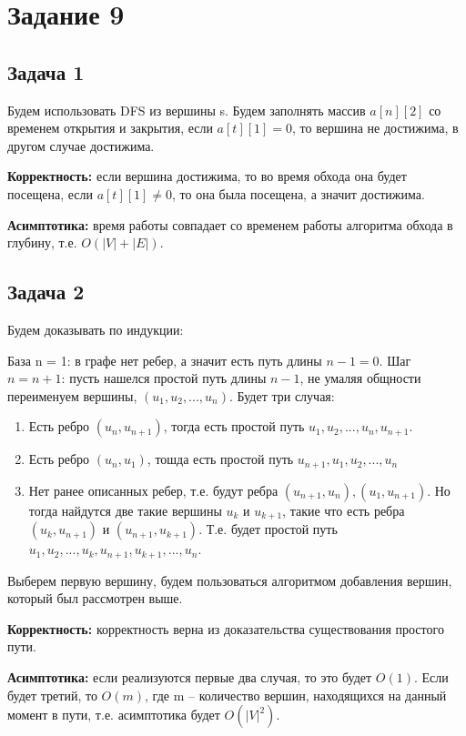 \documentclass[a4paper,14pt]{article} %
\begin{document}

\section{Задание 9}
\subsection{Задача 1}
Будем использовать DFS из вершины s. Будем заполнять массив $a[n][2]$ со временем открытия и закрытия,
 если $a[t][1] = 0$, то вершина не достижима, в другом случае достижима.

 \textbf{Корректность:} если вершина достижима, то во время обхода она будет посещена, если $a[t][1] \not = 0$, то она была посещена, а значит достижима.

 \textbf{Асимптотика:} время работы совпадает со временем работы алгоритма обхода в глубину, т.е. $O(|V| + |E|)$.

\subsection{Задача 2}
Будем доказывать по индукции:

База n = 1: в графе нет ребер, а значит есть путь длины $n - 1 = 0$.
\newline
Шаг $n = n + 1$: пусть нашелся простой путь длины $n - 1$, не умаляя общности переименуем вершины, $(u_1, u_2, ..., u_n)$.
Будет три случая:
\begin{enumerate}
	\item Есть ребро $(u_n, u_{n+1})$, тогда есть простой путь $u_1, u_2, ..., u_n, u_{n+1}$.
	\item Есть ребро $(u_n, u_1)$, тошда есть простой путь $u_{n+1}, u_1, u_2, ..., u_n$
	\item Нет ранее описанных ребер, т.е. будут ребра $(u_{n+1}, u_n), (u_1, u_{n+1})$. Но тогда
	найдутся две такие вершины $u_k$ и $u_{k+1}$, такие что есть ребра $(u_k, u_{n+1})$ и $(u_{n+1}, u_{k+1})$. Т.е. будет простой путь $u_1, u_2,..., u_k, u_{n+1}, u_{k+1}, ..., u_n$.
\end{enumerate}	
Выберем первую вершину, будем пользоваться алгоритмом добавления вершин, который был рассмотрен выше.

\textbf{Корректность:} корректность верна из доказательства существования простого пути.

\textbf{Асимптотика:} если реализуются первые два случая, то это будет $O(1)$. Если будет третий, то $O(m)$, где m -- количество вершин, находящихся на данный момент в пути, 
т.е. асимптотика будет $O(|V|^2)$.
\end{document}
